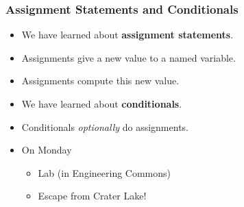 \documentclass{beamer}
\begin{document}
\begin{frame}[fragile]
\frametitle{Assignment Statements and Conditionals}
\Large
\begin{itemize}
\item We have learned about {\bf assignment statements}.
\item Assignments give a new value to a named variable.
\item Assignments compute this new value.
\frameskip
\frameskip{}
\item We have learned about {\bf conditionals}.
\item Conditionals {\em optionally\/} do assignments.
\frameskip{}
\frameskip{}
\item On Monday 
\begin{itemize}
\Large
\item Lab (in Engineering Commons)
\item Escape from Crater Lake!
\end{itemize}
\end{itemize}

\end{frame}
\end{document}
